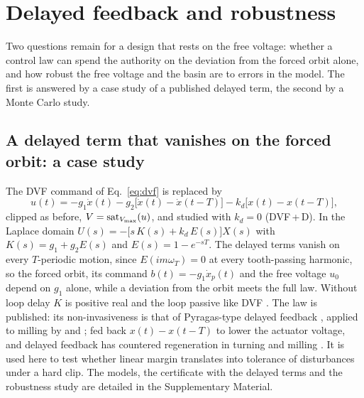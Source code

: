 \section{Delayed feedback and robustness}\label{sec:delayed}

Two questions remain for a design that rests on the free voltage: whether a control law can spend the authority on the deviation from the forced orbit alone, and how robust the free voltage and the basin are to errors in the model. The first is answered by a case study of a published delayed term, the second by a Monte Carlo study.

\subsection{A delayed term that vanishes on the forced orbit: a case study}\label{sec:delayed-law}

The DVF command of Eq.~\eqref{eq:dvf} is replaced by
\begin{equation}\label{eq:comb-law}
  u(t)=-g_1\dot x(t)-g_2\bigl[\dot x(t)-\dot x(t-T)\bigr]-k_d\bigl[x(t)-x(t-T)\bigr],
\end{equation}
clipped as before, $V=\operatorname{sat}_{V_{\max}}(u)$, and studied with $k_d=0$ (DVF\,+\,D). In the Laplace domain $U(s)=-\bigl[s\,K(s)+k_d\,E(s)\bigr]X(s)$ with $K(s)=g_1+g_2E(s)$ and $E(s)=1-e^{-sT}$. The delayed terms vanish on every $T$-periodic motion, since $E(im\omega_T)=0$ at every tooth-passing harmonic, so the forced orbit, its command $b(t)=-g_1\dot x_p(t)$ and the free voltage $u_0$ depend on $g_1$ alone, while a deviation from the orbit meets the full law. Without loop delay $K$ is positive real and the loop passive like DVF \citep{elliott2001feedback}. The law is published: its non-invasiveness is that of Pyragas-type delayed feedback \citep{pyragas1992continuous}, applied to milling by \citet{vandewouw2015ifac} and \citet{vandijk2015ijrnc}; \citet{li2022ijamt} fed back $x(t)-x(t-T)$ to lower the actuator voltage, and delayed feedback has countered regeneration in turning \citep{mancisidor2019mechatronics} and milling \citep{du2022time,du2024ijms}. It is used here to test whether linear margin translates into tolerance of disturbances under a hard clip. The models, the certificate with the delayed terms and the robustness study are detailed in the Supplementary Material.

